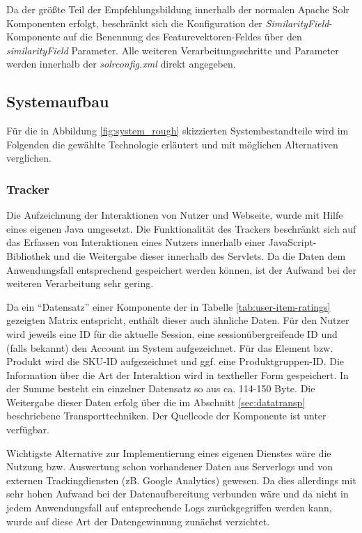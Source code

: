 Da der größte Teil der Empfehlungsbildung innerhalb der normalen Apache Solr Komponenten erfolgt, beschränkt sich die Konfiguration der \textit{SimilarityField}-Komponente auf die Benennung des Featurevektoren-Feldes über den \textit{similarityField} Parameter. Alle weiteren Verarbeitungsschritte und Parameter werden innerhalb der \textit{solrconfig.xml} direkt angegeben.

\subsection{Systemaufbau}

Für die in Abbildung \ref{fig:system_rough} skizzierten Systembestandteile wird im Folgenden die gewählte Technologie erläutert und mit möglichen Alternativen verglichen.

\subsubsection{Tracker} \label{sec:tracker-impl} Die Aufzeichnung der Interaktionen von Nutzer und Webseite, wurde mit Hilfe eines eigenen Java  umgesetzt. Die Funktionalität des Trackers beschränkt sich auf das Erfassen von Interaktionen eines Nutzers innerhalb einer JavaScript-Bibliothek und die Weitergabe dieser innerhalb des Servlets. Da die Daten dem Anwendungsfall entsprechend gespeichert werden können, ist der Aufwand bei der weiteren Verarbeitung sehr gering.

Da ein ``Datensatz'' einer Komponente der in Tabelle \ref{tab:user-item-ratings} gezeigten Matrix entspricht, enthält dieser auch ähnliche Daten. Für den Nutzer wird jeweils eine ID für die aktuelle Session, eine sessionübergreifende ID und (falls bekannt) den Account im System aufgezeichnet. Für das Element bzw. Produkt wird die \gls{SKU-ID} aufgezeichnet und ggf. eine Produktgruppen-\gls{ID}. Die Information über die Art der Interaktion wird in textheller Form gespeichert. In der Summe besteht ein einzelner Datensatz so aus ca. 114-150 Byte. Die Weitergabe dieser Daten erfolg über die im Abschnitt \ref{sec:datatransp} beschriebene Transporttechniken. Der Quellcode der Komponente ist unter  verfügbar.

Wichtigste Alternative zur Implementierung eines eigenen Dienstes wäre die Nutzung bzw. Auswertung schon vorhandener Daten aus Serverlogs und von externen Trackingdiensten (zB. Google Analytics) gewesen. Da dies allerdings mit sehr hohen Aufwand bei der Datenaufbereitung verbunden wäre und da nicht in jedem Anwendungsfall auf entsprechende Logs zurückgegriffen werden kann, wurde auf diese Art der Datengewinnung zunächst verzichtet.

